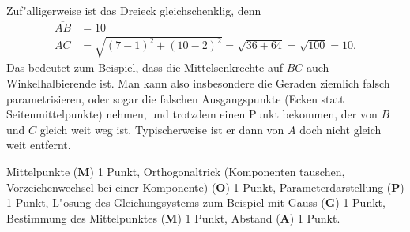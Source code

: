 \begin{diskussion}
Zuf"alligerweise ist das Dreieck gleichschenklig, denn
\begin{align*}
\overline{AB}
&=
10
\\
\overline{AC}
&=
\sqrt{(7-1)^2 + (10-2)^2}=\sqrt{36 + 64}=\sqrt{100}=10.
\end{align*}
Das bedeutet zum Beispiel, dass die Mittelsenkrechte auf $BC$ auch
Winkelhalbierende ist.
Man kann also insbesondere die Geraden ziemlich falsch parametrisieren,
oder sogar die falschen Ausgangspunkte (Ecken statt Seitenmittelpunkte)
nehmen, und trotzdem einen Punkt bekommen, der von $B$ und $C$ gleich
weit weg ist. Typischerweise ist er dann von $A$ doch nicht gleich weit
entfernt.
\end{diskussion}

\begin{bewertung}
Mittelpunkte ({\bf M}) 1 Punkt, Orthogonaltrick (Komponenten tauschen, 
Vorzeichenwechsel bei einer Komponente) ({\bf O}) 1 Punkt,
Parameterdarstellung ({\bf P}) 1 Punkt, L"osung des Gleichungsystems
zum Beispiel mit Gauss ({\bf G}) 1 Punkt, Bestimmung des Mittelpunktes
({\bf M}) 1 Punkt, Abstand ({\bf A}) 1 Punkt.
\end{bewertung}

